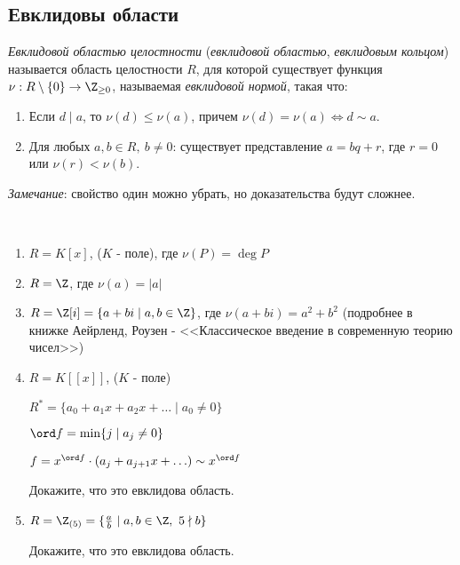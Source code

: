 \subsection{Евклидовы области}

\begin{defn}
    \emph{Евклидовой областью целостности} (\emph{евклидовой областью}, \emph{евклидовым кольцом}) называется область целостности $R$, 
    для которой существует функция $\nu: R \setminus \{0\} \to \Z_{\geq 0}$, называемая \emph{евклидовой нормой}, такая что:

    \begin{enumerate}
        \item Если $d \mid a$, то $\nu(d) \leq \nu(a)$, причем $\nu(d) = \nu(a) \iff d \sim a$.
        \item Для любых $a, b \in R,~b \neq 0$: существует представление $a = bq + r$, где $r = 0$ или $\nu(r) < \nu(b)$.
    \end{enumerate}

    \emph{Замечание}: свойство один можно убрать, но доказательства будут сложнее.
\end{defn}

\begin{examples}~

    \begin{enumerate}
        \item $R = K[x]$, ($K$ - поле), где $\nu(P) = \deg P$

        \item $R = \Z$, где $\nu(a) = |a|$
        
        \item $R = \Z[i] = \{ a + bi \mid a,b \in \Z \}$, где $\nu(a + bi) = a^2 + b^2$ 
        (подробнее в книжке Аейрленд, Роузен - <<Классическое введение в современную теорию чисел>>)
        
        \item $R = K[[x]]$, ($K$ - поле)
        
        $R^* = \{ a_0 + a_1 x + a_2 x + \ldots \mid a_0 \neq 0 \}$

        $\ord f =  \min \{ j \mid a_j \neq 0 \}$

        $f = x^{\ord f} \cdot (a_j + a_{j + 1}x + \ldots) \sim x^{\ord f}$ 

        \begin{exerc}
            Докажите, что это евклидова область.
        \end{exerc}

        \item $R = \Z_{(5)} = \{ \frac{a}{b} \mid a, b \in \Z,~5 \nmid b \}$
        
        \begin{exerc}
            Докажите, что это евклидова область.
        \end{exerc}
    \end{enumerate}
\end{examples}

